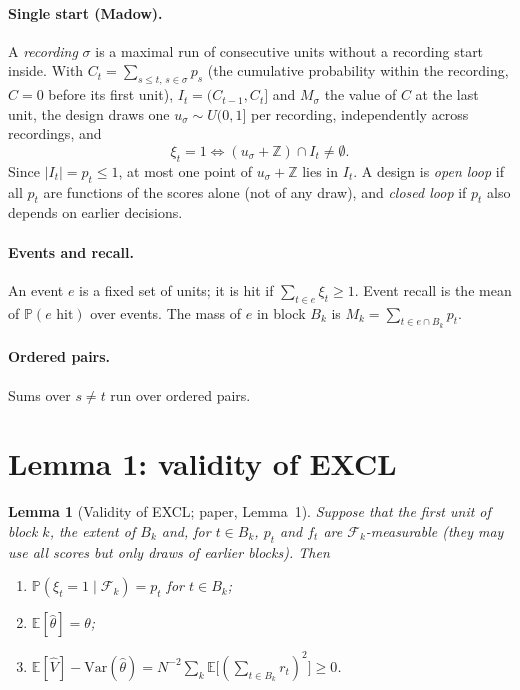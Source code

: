 \documentclass[11pt]{article}
\newtheorem{lemma}{Lemma}
\theoremstyle{remark}
\newcommand{\E}{\mathbb{E}}
\renewcommand{\Pr}{\mathbb{P}}
\newcommand{\Var}{\mathrm{Var}}
\newcommand{\Fk}{\mathcal F}
\newcommand{\hth}{\hat\theta}
\newcommand{\hV}{\hat V}
\begin{document}
\paragraph{Single start (Madow).}
A \emph{recording} $\sigma$ is a maximal run of consecutive units without a recording start inside. With $C_t=\sum_{s\le t,\,s\in\sigma}p_s$ (the cumulative probability within the recording, $C=0$ before its first unit), $I_t=(C_{t-1},C_t]$ and $M_\sigma$ the value of $C$ at the last unit, the design draws one $u_\sigma\sim U(0,1]$ per recording, independently across recordings, and
\[
\xi_t=1\iff (u_\sigma+\mathbb Z)\cap I_t\neq\emptyset .
\]
Since $|I_t|=p_t\le1$, at most one point of $u_\sigma+\mathbb Z$ lies in $I_t$. A design is \emph{open loop} if all $p_t$ are functions of the scores alone (not of any draw), and \emph{closed loop} if $p_t$ also depends on earlier decisions.

\paragraph{Events and recall.}
An event $e$ is a fixed set of units; it is hit if $\sum_{t\in e}\xi_t\ge1$. Event recall is the mean of $\Pr(e\text{ hit})$ over events. The mass of $e$ in block $B_k$ is $M_k=\sum_{t\in e\cap B_k}p_t$.

\paragraph{Ordered pairs.}
Sums over $s\ne t$ run over ordered pairs.

\section{Lemma 1: validity of EXCL}\label{sec:lemma}

\begin{lemma}[Validity of EXCL; paper, Lemma~1]\label{lem:valid}
Suppose that the first unit of block $k$, the extent of $B_k$ and, for $t\in B_k$, $p_t$ and $f_t$ are $\Fk_k$-measurable (they may use all scores but only draws of earlier blocks). Then
\begin{enumerate}[label=(\roman*)]
\item $\Pr(\xi_t=1\mid\Fk_k)=p_t$ for $t\in B_k$;
\item $\E[\hth]=\theta$;
\item $\E[\hV]-\Var(\hth)=N^{-2}\sum_k\E\big[(\sum_{t\in B_k}r_t)^2\big]\ge0$.
\end{enumerate}
\end{lemma}
\end{document}
